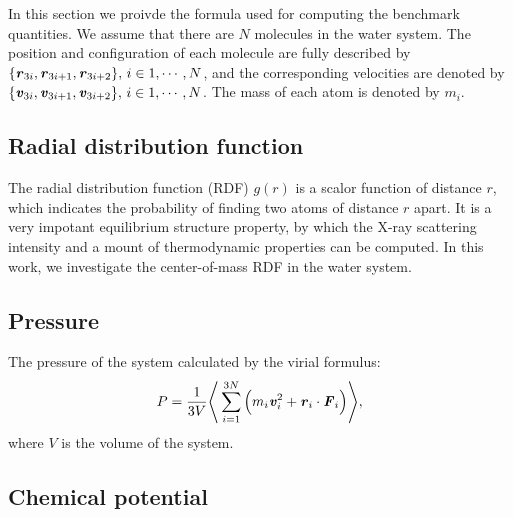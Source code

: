 \documentclass[aip,jcp,a4paper,preprint,unsortedaddress,onecolumn,fleqn]{revtex4-1}
\newcommand{\vect}[1]{\textbf{\textit{#1}}}
\begin{document}
In this section we proivde the formula used for computing the benchmark quantities. We assume that there are
$N$ molecules in the water system. The position and configuration of each molecule are fully described
by $\{\vect r_{3i},\vect r_{3i+1}, \vect r_{3i+2}\},\, i\in 1,\cdots,N$, and the corresponding velocities
are denoted by $\{\vect v_{3i},\vect v_{3i+1}, \vect v_{3i+2}\},\, i\in 1,\cdots,N$. The mass of each
atom is denoted by $m_i$.

\subsection{Radial distribution function}
The radial distribution function (RDF) $g(r)$ is a scalor function of distance $r$, which indicates the
probability of finding two atoms of distance $r$ apart.  It is a very
impotant equilibrium structure property, by which the X-ray scattering
intensity and a mount of thermodynamic properties can be computed.
In this work, we investigate the center-of-mass RDF in the water
system.


\subsection{Pressure}
The pressure of the system calculated by the virial formulus:
\begin{align}
  P = \frac1{3V}
  \Bigg\langle
  \sum_{i=1}^{3N} \Big( m_i\vect v_i^2 + \vect r_i\cdot \vect F_i \Big)
  \Bigg\rangle,
\end{align}
where $V$ is the volume of the system.

\subsection{Chemical potential}
\end{document}
